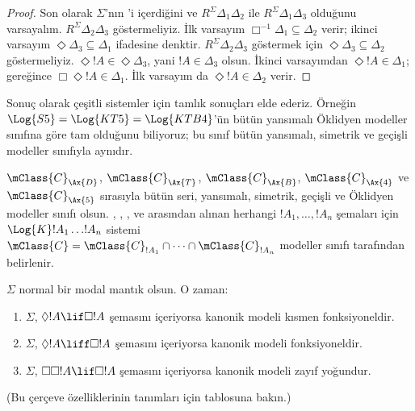 \documentclass[../../../include/open-logic-section]{subfiles}
\begin{document}
\begin{proof}
  Son olarak $\Sigma$'nın 'i içerdiğini ve
  $R^\Sigma\Delta_1\Delta_2$ ile $R^\Sigma\Delta_1\Delta_3$ olduğunu
  varsayalım. $R^\Sigma\Delta_2\Delta_3$ göstermeliyiz. İlk varsayım
  $\Box^{-1}\Delta_1\subseteq\Delta_2$ verir; ikinci varsayım
  $\Diamond\Delta_3\subseteq\Delta_1$ ifadesine denktir.
  $R^\Sigma\Delta_2\Delta_3$ göstermek için
  $\Diamond\Delta_3\subseteq\Delta_2$ göstermeliyiz.
  $\Diamond!A\in\Diamond\Delta_3$, yani $!A\in\Delta_3$ olsun. İkinci
  varsayımdan $\Diamond!A\in\Delta_1$;  gereğince
  $\Box\Diamond!A\in\Delta_1$. İlk varsayım da
  $\Diamond!A\in\Delta_2$ verir.
\end{proof}

Sonuç olarak çeşitli sistemler için tamlık sonuçları elde ederiz. Örneğin
$\Log{S5}=\Log{KT5}=\Log{KTB4}$'ün bütün yansımalı Öklidyen modeller
sınıfına göre tam olduğunu biliyoruz; bu sınıf bütün yansımalı, simetrik ve
geçişli modeller sınıfıyla aynıdır.

\begin{thm}
  $\mClass{C}_\Ax{D}$, $\mClass{C}_\Ax{T}$,
  $\mClass{C}_\Ax{B}$, $\mClass{C}_\Ax{4}$ ve
  $\mClass{C}_\Ax{5}$ sırasıyla bütün seri, yansımalı, simetrik, geçişli ve
  Öklidyen modeller sınıfı olsun. , , ,  ve
   arasından alınan herhangi $!A_1,\dots,!A_n$ şemaları için
  $\Log{K}!A_1\dots !A_n$ sistemi
  $\mClass{C}=\mClass{C}_{!A_1}\cap\dots\cap\mClass{C}_{!A_n}$ modeller
  sınıfı tarafından belirlenir.
\end{thm}

\begin{prop}
  $\Sigma$ normal bir modal mantık olsun. O zaman:
  \begin{enumerate}
  \item{}%
    $\Sigma$, $\Diamond!A\lif\Box!A$ şemasını içeriyorsa kanonik modeli
    kısmen fonksiyoneldir.
  \item $\Sigma$, $\Diamond!A\liff\Box!A$ şemasını içeriyorsa kanonik
    modeli fonksiyoneldir.
  \item $\Sigma$, $\Box\Box!A\lif\Box!A$ şemasını içeriyorsa kanonik
    modeli zayıf yoğundur.
  \end{enumerate}
  (Bu çerçeve özelliklerinin tanımları için
   tablosuna bakın.)
\end{prop}
\end{document}

